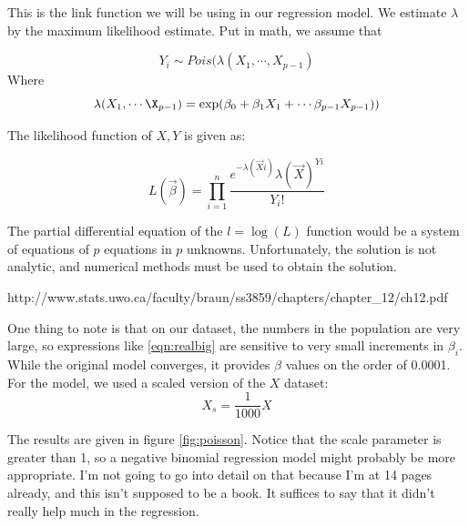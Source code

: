 This is the link function we will be using in our regression model. We estimate $\lambda$ by the maximum likelihood estimate. Put in math, we assume that 

\begin{equation}
Y_i \sim Pois(\lambda(X_1,\cdots,X_{p-1})
\end{equation} 
Where 
\begin{equation}
\lambda(X_1,\cdots\X_{p-1}) = \exp(\beta_0 + \beta_1X_1 + \cdots \beta_{p-1}X_{p-1})) \label{eqn:realbig}
\end{equation}

The likelihood function of $X,Y$ is given as:


\begin{equation}L(\vec{\beta}) = \prod_{i=1}^{n} \frac{e^{-\lambda(\vec{X}i)}\lambda(\vec{X})^{Yi}}{Y_i!}
\end{equation}

The partial differential equation of the $l = \log(L)$ function would be a system of equations of $p$ equations in $p$ unknowns. Unfortunately, the solution is not analytic, and numerical methods must be used to obtain the solution. 


http://www.stats.uwo.ca/faculty/braun/ss3859/chapters/chapter_12/ch12.pdf

One thing to note is that on our dataset, the numbers in the population are very large, so expressions like \ref{eqn:realbig} are sensitive to very small increments in $\beta_i$. While the original model converges, it provides $\beta$ values on the order of 0.0001. For the model, we used a scaled version of the $X$ dataset:
\begin{equation}
X_s = \frac{1}{1000}X
\end{equation}

The results are given in figure \ref{fig:poisson}. Notice that the scale parameter is greater than 1, so a negative binomial regression model might probably be more appropriate. I'm not going to go into detail on that because I'm at 14 pages already, and this isn't supposed to be a book. It suffices to say that it didn't really help much in the regression.

